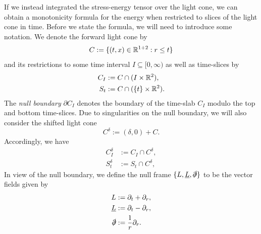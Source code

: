 If we instead integrated the stress-energy tensor over the light cone, we can obtain a monotonicity formula for the energy when restricted to slices of the light cone in time. Before we state the formula, we will need to introduce some notation. We denote the forward light cone by 
	\[ C := \{(t,x ) \in \mathbb R^{1 + 2} : r \leq t\} \]
and its restrictions to some time interval $I \subseteq [0, \infty)$ as well as time-slices by 
	\begin{align*}
		C_I 
			&:= C \cap (I \times \mathbb R^2), \\
		S_{t}
			&:= C \cap (\{t\} \times \mathbb R^2).
	\end{align*}
The \emph{null boundary} $\partial C_I$ denotes the boundary of the time-slab $C_I$ modulo the top and bottom time-slices. Due to singularities on the null boundary, we will also consider the shifted light cone 
	\[ C^\delta := (\delta, 0) + C. \]
Accordingly, we have 
	\begin{align*}
		C^\delta_I
			&:= C_I \cap C^\delta, \\
		S^\delta_t
			&:= S_t \cap C^\delta,		
	\end{align*}	
In view of the null boundary, we define the null frame $\{L, \underline L, \slashed\partial\}$ to be the vector fields given by 
	\begin{align*}
		L
			&:= \partial_t + \partial_r, \\
		\underline L
			&:= \partial_t - \partial_r,\\
		\slashed \partial
			&:= \frac1r \partial_r . 		
	\end{align*}
	

